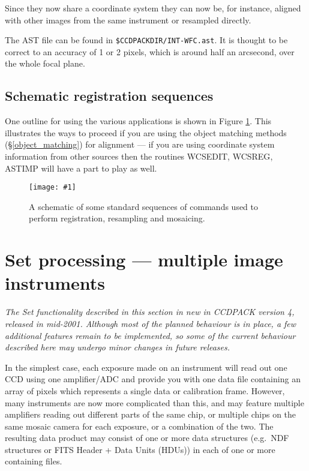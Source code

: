 \documentclass[twoside,11pt]{article}
\newcommand{\htmladdimg}[1]{}
\newcommand{\hyperref}[4]{#2\ref{#4}#3}
\newcommand{\htmlref}[2]{#1}
\newcommand{\xlabel}[1]{}
\renewcommand{\_}{\texttt{\symbol{95}}}
\newcommand{\xroutine}[1]{\htmlref{{\sc #1}}{#1}}
\newcommand{\myfig} [5] {
  \begin{figure}
    \centering\texttt{[image: \#1]}
    \typeout{#1 inserted on page \arabic{page}}
    \caption{\label{#4}#5}
  \end{figure}
  }
\newcommand{\myfig}[5]{
    \htmladdimg{#3}\\
    Figure: \label{#4} #5
    }
\begin{document}
Since they now share a coordinate system they can now be, for instance,
aligned with other images from the same instrument or resampled directly.

The AST file can be found in {\tt \$CCDPACK\_DIR/INT-WFC.ast}.
It is thought to be correct to an accuracy of 1 or 2 pixels, 
which is around half an arcsecond, over the whole focal plane.


\subsection{Schematic registration sequences}

One outline for using the various applications is shown in 
\hyperref{the following figure}{Figure }{}{fig:registration}.
This illustrates the ways to proceed if you are using the
object matching methods (\S \ref{object_matching}) 
for alignment --- if you are using coordinate system information
from other sources then the routines 
\xroutine{WCSEDIT}, \xroutine{WCSREG}, \xroutine{ASTIMP}
will have a part to play as well.

\myfig{sun139reg.eps}{}{reg.gif}{fig:registration}
{A schematic of some standard sequences of commands used to perform
registration, resampling and mosaicing.}

\clearpage


\section{\xlabel{ccdpack_sets}Set processing --- multiple image instruments
         \label{ccdpack_sets}}

{\em
The Set functionality described in this section in new in 
CCDPACK version 4, released in mid-2001.
Although most of the planned behaviour is in place, 
a few additional features remain to be implemented,
so some of the current behaviour described here may undergo minor changes
in future releases.
}


In the simplest case, each exposure made on an instrument
will read out one CCD using one amplifier/ADC and provide you 
with one data file containing an array 
of pixels which represents a single data or calibration frame.
However, many instruments are now more complicated than this,
and may feature multiple amplifiers reading out different parts of
the same chip, 
or multiple chips on the same mosaic camera for each
exposure, or a combination of the two.  
The resulting data product may consist of one or more data
structures (e.g.\ NDF structures or FITS Header + Data Units (HDUs)) 
in each of one or more containing files.
\end{document}
